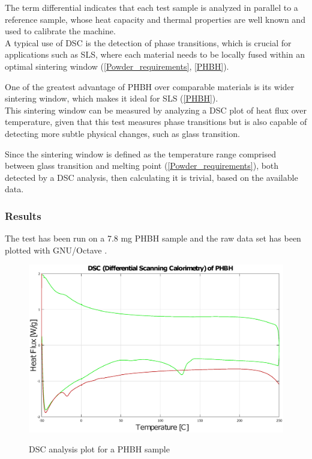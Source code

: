 \documentclass{article}
\begin{document}
        The term differential indicates that each test sample is analyzed in parallel to a reference sample, whose heat capacity and 
        thermal properties are well known and used to calibrate the machine. \\
        
        A typical use of DSC is the detection of phase transitions, which is crucial for applications such as SLS, where each material 
        needs to be locally fused within an optimal sintering window (\ref{Powder_requirements}, \ref{PHBH}). 

        One of the greatest advantage of PHBH over comparable materials is its wider sintering window, which makes it ideal 
        for SLS (\ref{PHBH}). \\ 

        This sintering window can be measured by analyzing a DSC plot of heat flux over temperature, given that this test measures 
        phase transitions but is also capable of detecting more subtle physical changes, such as glass transition. 

        Since the sintering window is defined as the temperature range comprised between glass transition and 
        melting point (\ref{Powder_requirements}), both detected by a DSC analysis, then calculating it is trivial, 
        based on the available data. 

            \subsubsection{Results}

            The test has been run on a 7.8 mg PHBH sample and the raw data set has been plotted with GNU/Octave \autocite{Octave}. 

                \begin{figure}[h!]
                    \centering
                    \includegraphics[width=\textwidth]{Pictures/Thermal_analysis_plots/DSC.eps}\\
                    \caption{DSC analysis plot for a PHBH sample} 
                    \label{fig:DSC_plot}
                \end{figure} 
\end{document}
